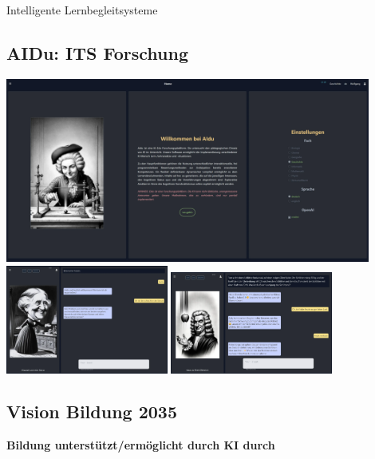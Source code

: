 \documentclass[
  letterpaper,
  DIV=11,
  numbers=noendperiod]{scrartcl}
\begin{document}
Intelligente Lernbegleitsysteme

\subsection{AIDu: ITS Forschung}\label{aidu-its-forschung}

\includegraphics[width=0.9\textwidth,height=\textheight]{images/AIdu.webp}
\includegraphics[width=0.4\textwidth,height=\textheight]{images/AIDu Welcome.webp}
\includegraphics[width=0.4\textwidth,height=\textheight]{images/AIDu Isaac.webp}

\subsection{Vision Bildung 2035}\label{vision-bildung-2035}

\textbf{Bildung unterstützt/ermöglicht durch KI durch}
\end{document}
